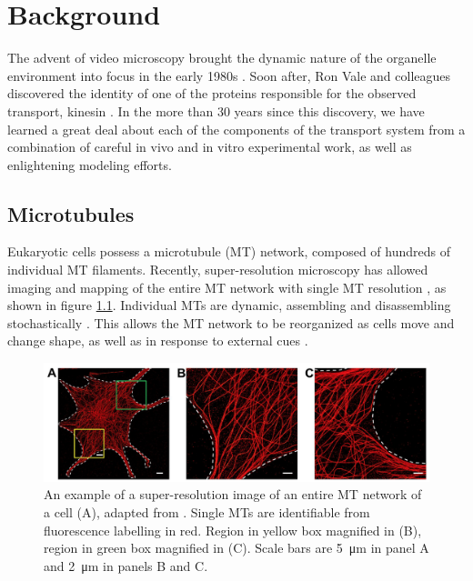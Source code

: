 \chapter{Background} \label{ch:background}

The advent of video microscopy brought the dynamic nature of the organelle environment into focus in the early 1980s \cite{Allen1981,Inoue1981}. Soon after, Ron Vale and colleagues discovered the identity of one of the proteins responsible for the observed transport, kinesin \cite{Vale1985}. In the more than 30 years since this discovery, we have learned a great deal about each of the components of the transport system from a combination of careful in vivo and in vitro experimental work, as well as enlightening modeling efforts.

\section{Microtubules}

Eukaryotic cells possess a microtubule (MT) network, composed of hundreds of individual MT filaments. Recently, super-resolution microscopy has allowed imaging and mapping of the entire MT network with single MT resolution \cite{Zhang2016}, as shown in figure \ref{fig:MTcytoskeleton}. Individual MTs are dynamic, assembling and disassembling stochastically \cite{Howard2003}. This allows the MT network to be reorganized as cells move and change shape, as well as in response to external cues \cite{Herms2015,Zhu2015,Zhang2016}. 

\begin{figure}
\centering
\includegraphics[scale=.5]{background/MTcytoskeleton}
\caption[Super-resolution image of a MT network]{An example of a super-resolution image of an entire MT network of a cell (A), adapted from \cite{Zhang2016}. Single MTs are identifiable from fluorescence labelling in red. Region in yellow box magnified in (B), region in green box magnified in (C). Scale bars are \SI{5}{\micro\meter} in panel A and \SI{2}{\micro\meter} in panels B and C.}
\label{fig:MTcytoskeleton}
\end{figure}

